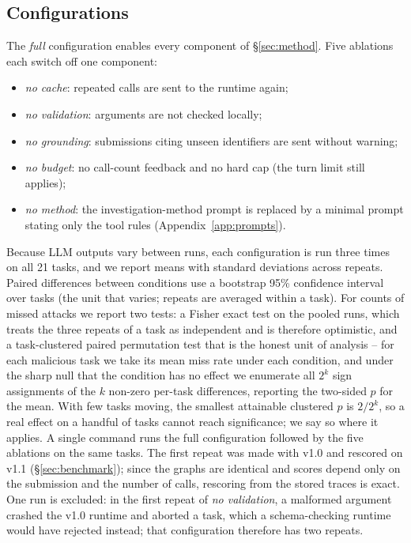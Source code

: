 \subsection{Configurations}
The \emph{full} configuration enables every component of \S\ref{sec:method}. Five ablations each switch off
one component:
\begin{itemize}
\item \emph{no cache}: repeated calls are sent to the runtime again;
\item \emph{no validation}: arguments are not checked locally;
\item \emph{no grounding}: submissions citing unseen identifiers are sent without warning;
\item \emph{no budget}: no call-count feedback and no hard cap (the turn limit still applies);
\item \emph{no method}: the investigation-method prompt is replaced by a minimal prompt stating only the tool
rules (Appendix~\ref{app:prompts}).
\end{itemize}
Because LLM outputs vary between runs, each configuration is run three times on all 21 tasks, and we report
means with standard deviations across repeats. Paired differences between conditions use a bootstrap 95\%
confidence interval over tasks (the unit that varies; repeats are averaged within a task). For counts of missed
attacks we report two tests: a Fisher exact test on the pooled runs, which treats the three repeats of a task as
independent and is therefore optimistic, and a task-clustered paired permutation test that is the honest unit of
analysis -- for each malicious task we take its mean miss rate under each condition, and under the sharp null
that the condition has no effect we enumerate all $2^{k}$ sign assignments of the $k$ non-zero per-task
differences, reporting the two-sided $p$ for the mean. With few tasks moving, the smallest attainable clustered
$p$ is $2/2^{k}$, so a real effect on a handful of tasks cannot reach significance; we say so where it applies. A single command runs the full configuration followed by the
five ablations on the same tasks. The first repeat was made with \bench v1.0 and rescored on v1.1
(\S\ref{sec:benchmark}); since the graphs are identical and scores depend only on the submission and the
number of calls, rescoring from the stored traces is exact. One run is excluded: in the first repeat of
\emph{no validation}, a malformed argument crashed the v1.0 runtime and aborted a task, which a schema-checking
runtime would have rejected instead; that configuration therefore has two repeats.

